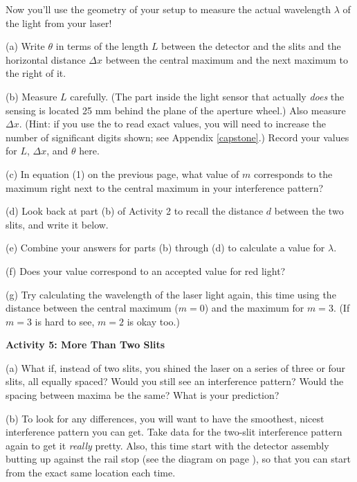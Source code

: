 Now you'll use the geometry of your setup to measure the actual wavelength $\lambda$ of the light from your laser!




(a) Write $\theta$ in terms of the length $L$ between the detector and the slits and the horizontal distance $\Delta x$ between the central maximum and the next maximum to the right of it.
\answerspace{0.4in}

(b) Measure $L$ carefully.  (The part inside the light sensor that actually \textit{does} the sensing is located 25 mm behind the plane of the aperture wheel.)  
Also measure $\Delta x$.  (Hint: if you use the  to read exact values, you will need to increase the number of significant digits shown; see Appendix \ref{capstone}.)
Record your values for $L$, $\Delta x$, and $\theta$ here.

\answerspace{0.8in}

(c) In equation (1) on the previous page, what value of $m$ corresponds to the maximum right next to the central maximum in your interference pattern?
\answerspace{0.3in}
 
(d) Look back at part (b) of Activity 2 to recall the distance $d$ between the two slits, and write it below.
\answerspace{0.3in}

(e) Combine your answers for parts (b) through (d) to calculate a value for $\lambda$.  
\answerspace{1in}

(f) Does your value correspond to an accepted value for red light?
\answerspace{0.3in}

(g) Try calculating the wavelength of the laser light again, this time using the distance between the central maximum ($m=0$) and the maximum for $m=3$.  (If $m=3$ is hard to see, $m=2$ is okay too.)
\answerspace{0.9in}


\pagebreak[2]
\textbf{Activity 5: More Than Two Slits}

(a) What if, instead of two slits, you shined the laser on a series of three or four slits, all equally spaced?  Would you still see an interference pattern?  Would the spacing between maxima be the same?  What is your prediction?
\answerspace{0.8in}

(b) To look for any differences, you will want to have the smoothest, nicest interference pattern you can get.  Take data for the two-slit interference pattern again to get it \textit{really} pretty.  Also, this time start with the detector assembly butting up against the rail stop (see the diagram on page \pageref{figure_rail_stop}), so that you can start from the exact same location each time.

